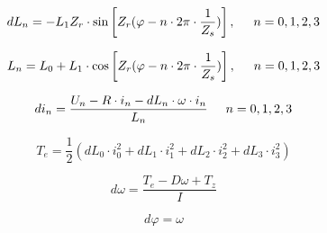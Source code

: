 \documentclass[12pt]{article}
\begin{document}
\begin{equation*}
	dL_n=-L_1Z_r\cdot \sin\left[Z_r(\varphi-n\cdot
	2\pi\cdot\frac{1}{Z_s})\right],\hspace{0.5cm} n=0,1,2,3
\end{equation*}

\begin{equation*}
	L_n=L_0+L_1\cdot \cos\left[Z_r(\varphi-n\cdot
	2\pi\cdot\frac{1}{Z_s})\right],\hspace{0.5cm} n=0,1,2,3
\end{equation*}

\begin{equation*}
	di_n=\frac{U_n-R\cdot i_n-dL_n\cdot\omega\cdot i_n}{L_n}\hspace{0.5cm}
	n=0,1,2,3
\end{equation*}

\begin{equation*}
	T_e=\frac{1}{2}(dL_0\cdot i_0^2+dL_1\cdot i_1^2+dL_2\cdot i_2^2+dL_3\cdot
	i_3^2)
\end{equation*}

\begin{equation*}
	d\omega=\frac{T_e-D\omega+T_z}{I}
\end{equation*}

\begin{equation*}
	d\varphi=\omega
\end{equation*}
\end{document}

